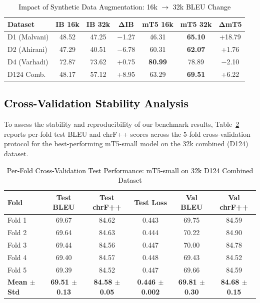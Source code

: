 \begin{table}[t]
\color{black}
\centering
\caption{\textcolor{black}{Impact of Synthetic Data Augmentation: 16k $\rightarrow$ 32k BLEU Change}}
\label{tab:augmentation_impact}
\begin{tabular}{lcccccc}
\hline
\textbf{Dataset} & \textbf{IB 16k} & \textbf{IB 32k} & $\boldsymbol{\Delta}$\textbf{IB} & \textbf{mT5 16k} & \textbf{mT5 32k} & $\boldsymbol{\Delta}$\textbf{mT5} \\
\hline
D1 (Malvani) & 48.52 & 47.25 & $-$1.27 & 46.31 & \textbf{65.10} & +18.79 \\
D2 (Ahirani) & 47.29 & 40.51 & $-$6.78 & 60.31 & \textbf{62.07} & +1.76 \\
D4 (Varhadi) & 72.87 & 73.62 & +0.75 & \textbf{80.99} & 78.89 & $-$2.10 \\
\hline
D124 Comb. & 48.17 & 57.12 & +8.95 & 63.29 & \textbf{69.51} & +6.22 \\
\hline
\end{tabular}
\end{table}


\subsection{\textcolor{black}{Cross-Validation Stability Analysis}}

To assess the stability and reproducibility of our benchmark results, Table~\ref{tab:cv_variance} reports per-fold test BLEU and chrF++ scores across the 5-fold cross-validation protocol for the best-performing mT5-small model on the 32k combined (D124) dataset.

\begin{table}[t]
\color{black}
\centering
\caption{\textcolor{black}{Per-Fold Cross-Validation Test Performance: mT5-small on 32k D124 Combined Dataset}}
\label{tab:cv_variance}
\begin{tabular}{lccccc}
\hline
\textbf{Fold} & \textbf{Test BLEU} & \textbf{Test chrF++} & \textbf{Test Loss} & \textbf{Val BLEU} & \textbf{Val chrF++} \\
\hline
Fold 1 & 69.67 & 84.62 & 0.443 & 69.75 & 84.59 \\
Fold 2 & 69.64 & 84.63 & 0.444 & 70.22 & 84.90 \\
Fold 3 & 69.44 & 84.56 & 0.447 & 70.00 & 84.78 \\
Fold 4 & 69.40 & 84.57 & 0.448 & 69.43 & 84.52 \\
Fold 5 & 69.39 & 84.52 & 0.447 & 69.66 & 84.59 \\
\hline
\textbf{Mean $\pm$ Std} & \textbf{69.51 $\pm$ 0.13} & \textbf{84.58 $\pm$ 0.05} & \textbf{0.446 $\pm$ 0.002} & \textbf{69.81 $\pm$ 0.30} & \textbf{84.68 $\pm$ 0.15} \\
\hline
\end{tabular}
\end{table}

